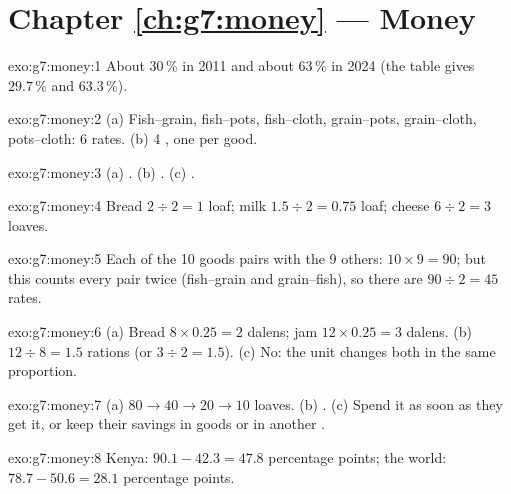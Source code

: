 \section*{Chapter \ref{ch:g7:money} --- Money}

\begin{solution}{exo:g7:money:1}
About $30\,\%$ in 2011 and about $63\,\%$ in 2024 (the table gives $29.7\,\%$ and $63.3\,\%$).
\end{solution}

\begin{solution}{exo:g7:money:2}
(a) Fish--grain, fish--pots, fish--cloth, grain--pots, grain--cloth, pots--cloth: 6 rates.
(b) 4 , one per good.
\end{solution}

\begin{solution}{exo:g7:money:3}
(a) . (b) . (c) .
\end{solution}

\begin{solution}{exo:g7:money:4}
Bread $2 \div 2 = 1$ loaf; milk $1.5 \div 2 = 0.75$ loaf; cheese $6 \div 2 = 3$ loaves.
\end{solution}

\begin{solution}{exo:g7:money:5}
Each of the 10 goods pairs with the 9 others: $10 \times 9 = 90$; but this counts every pair
twice (fish--grain and grain--fish), so there are $90 \div 2 = 45$ rates.
\end{solution}

\begin{solution}{exo:g7:money:6}
(a) Bread $8 \times 0.25 = 2$ dalens; jam $12 \times 0.25 = 3$ dalens. (b) $12 \div 8 = 1.5$
rations (or $3 \div 2 = 1.5$). (c) No: the unit changes both  in the same proportion.
\end{solution}

\begin{solution}{exo:g7:money:7}
(a) $80 \to 40 \to 20 \to 10$ loaves. (b) . (c) Spend it as soon as they get it,
or keep their savings in goods or in another .
\end{solution}

\begin{solution}{exo:g7:money:8}
Kenya: $90.1 - 42.3 = 47.8$ percentage points; the world: $78.7 - 50.6 = 28.1$ percentage
points.
\end{solution}

